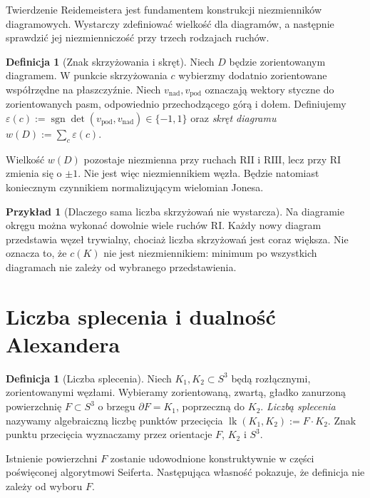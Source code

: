 \documentclass[11pt,a4paper]{report}
\numberwithin{equation}{section}
\theoremstyle{plain}
\theoremstyle{definition}
\newtheorem{definicja}[twierdzenie]{Definicja}
\newtheorem{przyklad}[twierdzenie]{Przykład}
\theoremstyle{remark}
\begin{document}
Twierdzenie Reidemeistera jest fundamentem konstrukcji niezmienników
diagramowych. Wystarczy zdefiniować wielkość dla diagramów, a następnie
sprawdzić jej niezmienniczość przy trzech rodzajach ruchów.

\begin{definicja}[Znak skrzyżowania i skręt]
Niech $D$ będzie zorientowanym diagramem. W punkcie skrzyżowania
$c$ wybierzmy dodatnio zorientowane współrzędne na płaszczyźnie.
Niech $v_{\mathrm{nad}},v_{\mathrm{pod}}$ oznaczają wektory styczne
do zorientowanych pasm, odpowiednio przechodzącego górą i dołem.
Definiujemy $\varepsilon(c):=\operatorname{sgn}\det(v_{\mathrm{pod}},v_{\mathrm{nad}})
\in\{-1,1\}$ oraz \emph{skręt diagramu}
$w(D):=\sum_{c}\varepsilon(c)$.
\end{definicja}

Wielkość $w(D)$ pozostaje niezmienna przy ruchach $\mathrm{R II}$
i $\mathrm{R III}$, lecz przy $\mathrm{R I}$ zmienia się o $\pm1$.
Nie jest więc niezmiennikiem węzła. Będzie natomiast koniecznym
czynnikiem normalizującym wielomian Jonesa.

\begin{przyklad}[Dlaczego sama liczba skrzyżowań nie wystarcza]
Na diagramie okręgu można wykonać dowolnie wiele ruchów $\mathrm{R I}$.
Każdy nowy diagram przedstawia węzeł trywialny, chociaż liczba
skrzyżowań jest coraz większa. Nie oznacza to, że $c(K)$ nie jest
niezmiennikiem: minimum po wszystkich diagramach nie zależy od
wybranego przedstawienia.
\end{przyklad}

\section{Liczba splecenia i dualność Alexandera}
\label{sec:kt-linking}

\begin{definicja}[Liczba splecenia]
Niech $K_1,K_2\subset S^3$ będą rozłącznymi, zorientowanymi węzłami.
Wybieramy zorientowaną, zwartą, gładko zanurzoną powierzchnię
$F\subset S^3$ o brzegu $\partial F=K_1$, poprzeczną do $K_2$.
\emph{Liczbą splecenia} nazywamy algebraiczną liczbę punktów
przecięcia $\operatorname{lk}(K_1,K_2):=F\cdot K_2$.
Znak punktu przecięcia wyznaczamy przez orientacje $F$, $K_2$ i $S^3$.
\end{definicja}

Istnienie powierzchni $F$ zostanie udowodnione konstruktywnie
w części poświęconej algorytmowi Seiferta. Następująca własność
pokazuje, że definicja nie zależy od wyboru $F$.
\end{document}
